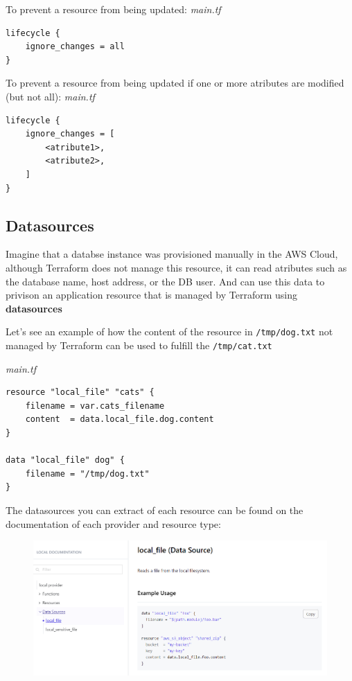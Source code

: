 \documentclass{article}
\newenvironment{codetemplate}[1][]{%
  \mybasecolorbox[#1]
  \itshape
}{%
  \endmybasecolorbox
}
\begin{document}
To prevent a resource from being updated:
\begin{codetemplate}{main.tf}
\begin{verbatim}
lifecycle {
    ignore_changes = all
}
\end{verbatim}
\end{codetemplate}

To prevent a resource from being updated if one or more atributes are modified (but not all):
\begin{codetemplate}{main.tf}
\begin{verbatim}
lifecycle {
    ignore_changes = [
        <atribute1>,
        <atribute2>,
    ]
}
\end{verbatim}
\end{codetemplate}

\subsection{Datasources}
Imagine that a databse instance was provisioned manually in the AWS Cloud, although Terraform does not manage this resource, it can read atributes  such as the database name, host address, or the DB user. And can use this data to privison an application resource that is managed by Terraform using \textbf{datasources}

Let's see an example of how the content of the resource in \verb+/tmp/dog.txt+ not managed by Terraform can be used to fulfill the \verb+/tmp/cat.txt+

\begin{codetemplate}{main.tf}
\begin{verbatim}
resource "local_file" "cats" {
    filename = var.cats_filename
    content  = data.local_file.dog.content
}

data "local_file" dog" {
    filename = "/tmp/dog.txt"
} 
\end{verbatim}
\end{codetemplate}

The datasources you can extract of each resource can be found on the documentation of each provider and resource type:

\begin{figure}[H]
    \includegraphics[width=\textwidth]{pictures/pic9.png}
    \centering
\end{figure}
\end{document}
